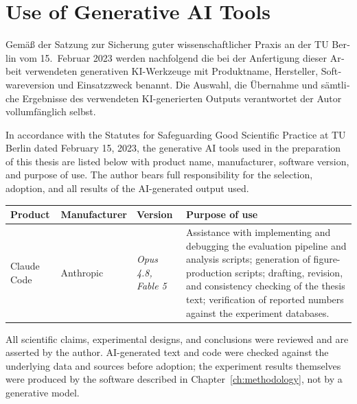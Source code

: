 %
\chapter*{Use of Generative AI Tools}

\begin{otherlanguage}{ngerman}
Gemäß der Satzung zur Sicherung guter wissenschaftlicher Praxis an der TU
Berlin vom 15.\ Februar 2023 werden nachfolgend die bei der Anfertigung
dieser Arbeit verwendeten generativen KI-Werkzeuge mit Produktname,
Hersteller, Softwareversion und Einsatzzweck benannt. Die Auswahl, die
Übernahme und sämtliche Ergebnisse des verwendeten KI-generierten Outputs
verantwortet der Autor vollumfänglich selbst.
\end{otherlanguage}

\medskip

In accordance with the Statutes for Safeguarding Good Scientific Practice at
TU Berlin dated February 15, 2023, the generative AI tools used in the
preparation of this thesis are listed below with product name, manufacturer,
software version, and purpose of use. The author bears full responsibility
for the selection, adoption, and all results of the AI-generated output used.

\begin{table}[htbp]
\centering
\begin{tabular}{p{2.9cm}p{2.2cm}p{2.6cm}p{5.4cm}}
\toprule
Product & Manufacturer & Version & Purpose of use \\
\midrule
Claude Code &
Anthropic &
\textit{Opus 4.8, Fable 5} &
Assistance with implementing and debugging the evaluation pipeline and
analysis scripts; generation of figure-production scripts; drafting,
revision, and consistency checking of the thesis text; verification of
reported numbers against the experiment databases. \\

\end{tabular}
\end{table}

All scientific claims, experimental designs, and conclusions were reviewed
and are asserted by the author. AI-generated text and code were checked
against the underlying data and sources before adoption; the experiment
results themselves were produced by the software described in
Chapter~\ref{ch:methodology}, not by a generative model.
